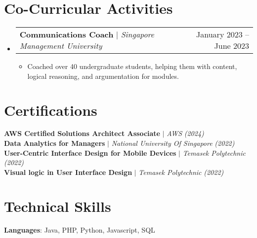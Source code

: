 \documentclass[letterpaper,11pt]{article}
\makeatletter
\newcommand{\resumeItem}[1]{
  \item\small{
    {#1 \vspace{-2pt}}
  }
}
\newcommand{\resumeProjectHeading}[2]{
    \item
    \begin{tabular*}{0.97\textwidth}{l@{\extracolsep{\fill}}r}
      \small#1 & #2 \\
    \end{tabular*}\vspace{-7pt}
}
\newcommand{\resumeSubHeadingListStart}{\begin{itemize}[leftmargin=0.15in, label={}]}
\newcommand{\resumeSubHeadingListEnd}{\end{itemize}}
\newcommand{\resumeItemListStart}{\begin{itemize}}
\newcommand{\resumeItemListEnd}{\end{itemize}\vspace{-5pt}}
\makeatother
\begin{document}
\section{Co-Curricular Activities}
    \resumeSubHeadingListStart
      \resumeProjectHeading
          {\textbf{Communications Coach} $|$ \emph{Singapore Management University}}{January 2023 -- June 2023}
              \resumeItemListStart
            \resumeItem{Coached over 40 undergraduate students, helping them with content, logical reasoning, and argumentation for modules.}
          \resumeItemListEnd
        
\resumeSubHeadingListEnd


%
\section{Certifications}
 \begin{itemize}[leftmargin=0.15in, label={}]
    \small{\item{
     \textbf{AWS Certified Solutions Architect Associate}  $|$ \emph{AWS} \emph{(2024)} \\
     \textbf{Data Analytics for Managers} $|$ \emph{National University Of Singapore} \emph{(2022)} \\
     \textbf{User-Centric Interface Design for Mobile Devices}  $|$ \emph{Temasek Polytechnic} \emph{(2022)} \\
     \textbf{Visual logic in User Interface Design}  $|$ \emph{Temasek Polytechnic} \emph{(2022)} \\
    }}
 \end{itemize}


%
\section{Technical Skills}
 \begin{itemize}[leftmargin=0.15in, label={}]
    \small{\item{
     \textbf{Languages}{: Java, PHP, Python, Javascript, SQL} \\
    }}
 \end{itemize}


\end{document}
